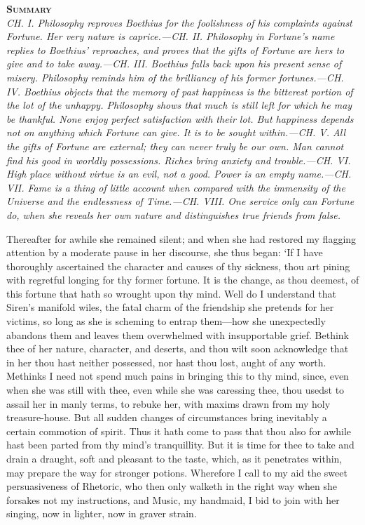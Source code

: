 \documentclass[11pt]{book}
\newenvironment{abstract}%
  {\noindent \textbf{\scshape Summary} \\ \rightskip1in\itshape\small}%
  {\bigskip}
\begin{document}
\begin{abstract}
     CH. I. Philosophy reproves Boethius for the foolishness of his
     complaints against Fortune. Her very nature is caprice.---CH. II.
     Philosophy in Fortune's name replies to Boethius' reproaches, and
     proves that the gifts of Fortune are hers to give and to take
     away.---CH. III. Boethius falls back upon his pres\-ent sense of
     misery. Philosophy reminds him of the brilliancy of his former
     fortunes.---CH. IV. Boethius objects that the memory of past
     happiness is the bitterest portion of the lot of the unhappy.
     Philosophy shows that much is still left for which he may be
     thankful. None enjoy perfect satisfaction with their lot. But
     happiness depends not on anything which Fortune can give. It is to
     be sought within.---CH. V. All the gifts of Fortune are external;
     they can never truly be our own. Man cannot find his good in
     worldly possessions. Riches bring anxiety and trouble.---CH. VI.
     High place without virtue is an evil, not a good. Power is an empty
     name.---CH. VII. Fame is a thing of little account when compared
     with the immensity of the Universe and the endlessness of
     Time.---CH. VIII. One service only can Fortune do, when she reveals
     her own nature and distinguishes true friends from false.
\end{abstract}





Thereafter for awhile she remained silent; and when she had restored my
flagging attention by a moderate pause in her discourse, she thus began:
`If I have thoroughly ascertained the character and causes of thy
sickness, thou art pining with regretful longing for thy former fortune.
It is the change, as thou deemest, of this fortune that hath so wrought
upon thy mind. Well do I understand that Siren's manifold wiles, the
fatal charm of the friendship she pretends for her victims, so long as
she is scheming to entrap them---how she unexpectedly abandons them and
leaves them overwhelmed with insupportable grief. Bethink thee of her
nature, character, and deserts, and thou wilt soon acknowledge that in
her thou hast neither possessed, nor hast thou lost, aught of any worth.
Methinks I need not spend much pains in bringing this to thy mind,
since, even when she was still with thee, even while she was caressing
thee, thou usedst to assail her in manly terms, to rebuke her, with
maxims drawn from my holy treasure-house. But all sudden changes of
circumstances bring inevitably a certain commotion of spirit. Thus it
hath come to pass that thou also for awhile hast been parted from thy
mind's tranquillity. But it is time for thee to take and drain a
draught, soft and pleasant to the taste, which, as it penetrates within,
may prepare the way for stronger potions. Wherefore I call to my aid the
sweet persuasiveness of Rhetoric, who then only walketh in the right way
when she forsakes not my instructions, and Music, my handmaid, I bid to
join with her singing, now in lighter, now in graver strain.
\end{document}
